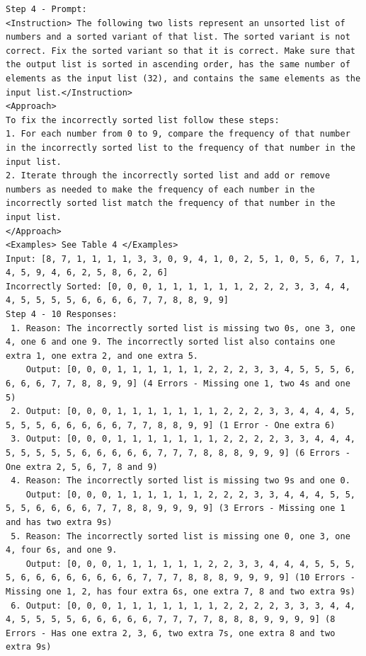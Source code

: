 \documentclass[11pt,UTF8,fontset=fandol]{ctexart}
\begin{document}
\begin{table}[H]\centering
\caption{对 32 元素列表的排序：第 4 步（提示/回复）。}
\label{tab:9}
\end{table}
\begin{lstlisting}
Step 4 - Prompt:
<Instruction> The following two lists represent an unsorted list of numbers and a sorted variant of that list. The sorted variant is not correct. Fix the sorted variant so that it is correct. Make sure that the output list is sorted in ascending order, has the same number of elements as the input list (32), and contains the same elements as the input list.</Instruction>
<Approach>
To fix the incorrectly sorted list follow these steps:
1. For each number from 0 to 9, compare the frequency of that number in the incorrectly sorted list to the frequency of that number in the input list.
2. Iterate through the incorrectly sorted list and add or remove numbers as needed to make the frequency of each number in the incorrectly sorted list match the frequency of that number in the input list.
</Approach>
<Examples> See Table 4 </Examples>
Input: [8, 7, 1, 1, 1, 1, 3, 3, 0, 9, 4, 1, 0, 2, 5, 1, 0, 5, 6, 7, 1, 4, 5, 9, 4, 6, 2, 5, 8, 6, 2, 6]
Incorrectly Sorted: [0, 0, 0, 1, 1, 1, 1, 1, 1, 2, 2, 2, 3, 3, 4, 4, 4, 5, 5, 5, 5, 6, 6, 6, 6, 7, 7, 8, 8, 9, 9]
Step 4 - 10 Responses:
 1. Reason: The incorrectly sorted list is missing two 0s, one 3, one 4, one 6 and one 9. The incorrectly sorted list also contains one extra 1, one extra 2, and one extra 5.
    Output: [0, 0, 0, 1, 1, 1, 1, 1, 1, 2, 2, 2, 3, 3, 4, 5, 5, 5, 6, 6, 6, 6, 7, 7, 8, 8, 9, 9] (4 Errors - Missing one 1, two 4s and one 5)
 2. Output: [0, 0, 0, 1, 1, 1, 1, 1, 1, 1, 2, 2, 2, 3, 3, 4, 4, 4, 5, 5, 5, 5, 6, 6, 6, 6, 6, 7, 7, 8, 8, 9, 9] (1 Error - One extra 6)
 3. Output: [0, 0, 0, 1, 1, 1, 1, 1, 1, 1, 2, 2, 2, 2, 3, 3, 4, 4, 4, 5, 5, 5, 5, 5, 6, 6, 6, 6, 6, 7, 7, 7, 8, 8, 8, 9, 9, 9] (6 Errors - One extra 2, 5, 6, 7, 8 and 9)
 4. Reason: The incorrectly sorted list is missing two 9s and one 0.
    Output: [0, 0, 0, 1, 1, 1, 1, 1, 1, 2, 2, 2, 3, 3, 4, 4, 4, 5, 5, 5, 5, 6, 6, 6, 6, 7, 7, 8, 8, 9, 9, 9, 9] (3 Errors - Missing one 1 and has two extra 9s)
 5. Reason: The incorrectly sorted list is missing one 0, one 3, one 4, four 6s, and one 9.
    Output: [0, 0, 0, 1, 1, 1, 1, 1, 1, 2, 2, 3, 3, 4, 4, 4, 5, 5, 5, 5, 6, 6, 6, 6, 6, 6, 6, 6, 7, 7, 7, 8, 8, 8, 9, 9, 9, 9] (10 Errors - Missing one 1, 2, has four extra 6s, one extra 7, 8 and two extra 9s)
 6. Output: [0, 0, 0, 1, 1, 1, 1, 1, 1, 1, 2, 2, 2, 2, 3, 3, 3, 4, 4, 4, 5, 5, 5, 5, 6, 6, 6, 6, 6, 7, 7, 7, 7, 8, 8, 8, 9, 9, 9, 9] (8 Errors - Has one extra 2, 3, 6, two extra 7s, one extra 8 and two extra 9s)

\end{lstlisting}
\end{document}
